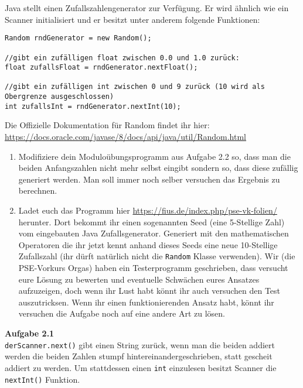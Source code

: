 \documentclass{../../sheet}
\begin{document}
\newpage
{}
Java stellt einen Zufallszahlengenerator zur Verfügung. Er wird ähnlich wie ein Scanner initialisiert und er besitzt unter anderem folgende Funktionen:

\begin{verbatim}
Random rndGenerator = new Random();

//gibt ein zufälligen float zwischen 0.0 und 1.0 zurück:
float zufallsFloat = rndGenerator.nextFloat();

//gibt ein zufälligen int zwischen 0 und 9 zurück (10 wird als Obergrenze ausgeschlossen)
int zufallsInt = rndGenerator.nextInt(10);
\end{verbatim}
Die Offizielle Dokumentation für Random findet ihr hier: \url{https://docs.oracle.com/javase/8/docs/api/java/util/Random.html}

\begin{enumerate}
    \item Modifiziere dein Moduloübungsprogramm aus Aufgabe 2.2 so, dass man die beiden Anfangszahlen nicht mehr selbst eingibt sondern so, dass diese zufällig generiert werden. Man soll immer noch selber versuchen das Ergebnis zu berechnen. 
    \item Ladet euch das Programm hier \url{https://fius.de/index.php/pse-vk-folien/} herunter. Dort bekommt ihr einen sogenannten Seed (eine 5-Stellige Zahl) vom eingebauten Java Zufallsgenerator. Generiert mit den mathematischen Operatoren die ihr jetzt kennt anhand dieses Seeds eine neue 10-Stellige Zufallszahl (ihr dürft natürlich nicht die \texttt{Random} Klasse verwenden). Wir (die PSE-Vorkurs Orgas) haben ein Testerprogramm geschrieben, dass versucht eure Lösung zu bewerten und eventuelle Schwächen eures Ansatzes aufzuzeigen, doch wenn ihr Lust habt könnt ihr auch versuchen den Test auszutricksen. Wenn ihr einen funktionierenden Ansatz habt, könnt ihr versuchen die Aufgabe noch auf eine andere Art zu lösen.   
\end{enumerate}

\newpage
{}
\hypertarget{Aufgabe_2.1}{}
\textbf{Aufgabe 2.1}\\
\texttt{derScanner.next()} gibt einen String zurück, wenn man die beiden addiert werden die beiden Zahlen stumpf hintereinandergeschrieben, statt gescheit addiert zu werden. Um stattdessen einen \texttt{int} einzulesen besitzt Scanner die \texttt{nextInt()} Funktion.
\end{document}
